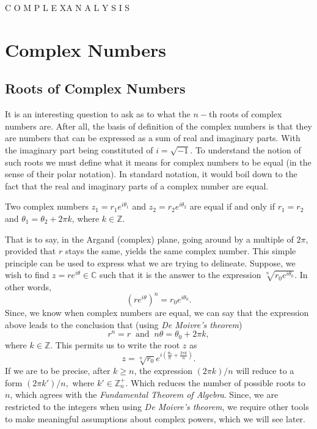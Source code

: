 \documentclass[12pt]{book}
\begin{document}
    \begin{titlingpage}
        \maketitle
    
        \vspace{-50pt}
        \begin{center}
            \Large C O M P L E X\;\;A N A L Y S I S 
        \end{center}
    \end{titlingpage}

\tableofcontents

\chapter{Complex Numbers}
\section{Roots of Complex Numbers}
It is an interesting question to ask as to what the $n-$th roots of complex numbers are. After all, the basis of definition of the complex numbers is that they are numbers that can be expressed as a sum of real and imaginary parts. With the imaginary part being constituted of $i = \sqrt{-1}.$ To understand the notion of such roots we must define what it means for complex numbers to be equal (in the sense of their polar notation). In standard notation, it would boil down to the fact that the real and imaginary parts of a complex number are equal.

\begin{defn}
    Two complex numbers $z_1 = r_1e^{i\theta_{1}}$ and $z_2 = r_2e^{i\theta_{2}}$ are equal if and only if $r_1 = r_2$ and $\theta_{1} = \theta_{2} + 2\pi k$, where $k \in \mathbb{Z}$.
\end{defn}

That is to say, in the Argand (complex) plane, going around by a multiple of $2\pi$, provided that $r$ stays the same, yields the same complex number. This simple principle can be used to express what we are trying to delineate. Suppose, we wish to find $z = r e^{i\theta} \in \mathbb{C}$ such that it is the answer to the expression $\sqrt[n]{r_0 e^{i\theta_{0}}}.$ In other words,
\[
    (r e^{i\theta})^{n} = r_0 e^{i\theta_{0}}.
\]  
Since, we know when complex numbers are equal, we can say that the expression above leads to the conclusion that (using \textit{De Moivre's theorem})
\[
    r^{n} = r\;\;\text{and}\;\; n\theta = \theta_{0} + 2\pi k,
\]
where $k \in \mathbb{Z}.$ This permits us to write the root $z$ as 
\[
    z = \sqrt[n]{r_0} e^{i\left(\frac{\theta_{0}}{n} + \frac{2\pi k}{n}\right)}.
\]
If we are to be precise, after $k \geq n$, the expression $(2\pi k) / n$ will reduce to a form $(2 \pi k') /n,$ where $k' \in \mathbb{Z}^{+}_{n}.$ Which reduces the number of possible roots to $n$, which agrees with the \textit{Fundamental Theorem of Algebra}. Since, we are restricted to the integers when using \textit{De Moivre's theorem}, we require other tools to make meaningful assumptions about complex powers, which we will see later.
\end{document}
